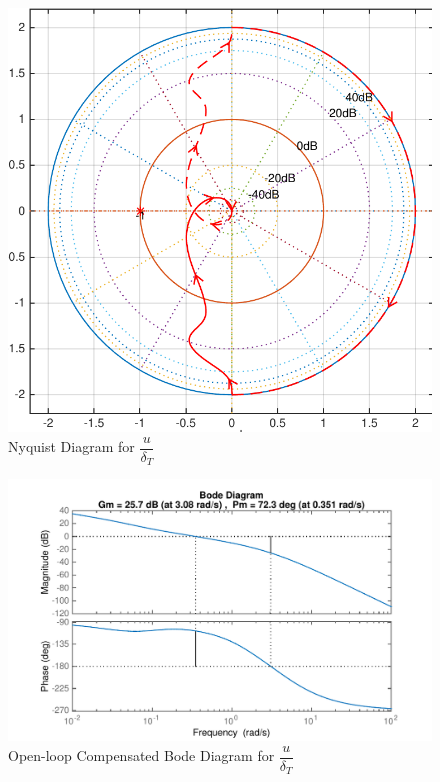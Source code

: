 \documentclass[11pt]{article}
\begin{document}
\begin{figure}[b!]
\begin{center}
\includegraphics[height=.4\textheight]{figures/nyquist_u}
\caption{Nyquist Diagram for $\dfrac{u}{\delta_T}$}
\end{center}
\end{figure}

\begin{figure}[h!]
\begin{center}
\includegraphics[height=.4\textheight]{figures/open_comp_u}
\caption{Open-loop Compensated Bode Diagram for $\dfrac{u}{\delta_T}$}
\end{center}
\end{figure}
\end{document}
